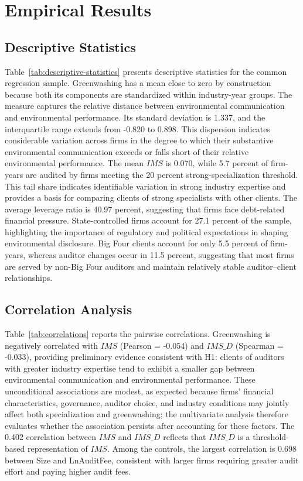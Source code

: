 \documentclass[11pt]{article}
\begin{document}
\section{Empirical Results}

\subsection{Descriptive Statistics}

Table~\ref{tab:descriptive-statistics} presents descriptive statistics for the common regression sample. 
Greenwashing has a mean close to zero by construction because both its components are standardized within industry-year groups. 
The measure captures the relative distance between environmental communication and environmental performance. 
Its standard deviation is 1.337, and the interquartile range extends from -0.820 to 0.898. 
This dispersion indicates considerable variation across firms in the degree to which their substantive environmental communication exceeds or falls short of their relative environmental performance.
The mean \(IMS\) is 0.070, while 5.7 percent of firm-years are audited by firms meeting the 20 percent strong-specialization threshold. 
This tail share indicates identifiable variation in strong industry expertise and provides a basis for comparing clients of strong specialists with other clients.
The average leverage ratio is 40.97 percent, suggesting that firms face debt-related financial pressure.
State-controlled firms account for 27.1 percent of the sample, highlighting the importance of regulatory and political expectations in shaping environmental disclosure. 
Big Four clients account for only 5.5 percent of firm-years, whereas auditor changes occur in 11.5 percent, suggesting that most firms are served by non-Big Four auditors and maintain relatively stable auditor–client relationships.

\subsection{Correlation Analysis}

Table~\ref{tab:correlations} reports the pairwise correlations. 
Greenwashing is negatively correlated with \(IMS\) (Pearson = -0.054) and \(IMS\_D\) (Spearman = -0.033), providing preliminary evidence consistent with H1: clients of auditors with greater industry expertise tend to exhibit a smaller gap between environmental communication and environmental performance. 
These unconditional associations are modest, as expected because firms' financial characteristics, governance, auditor choice, and industry conditions may jointly affect both specialization and greenwashing; the multivariate analysis therefore evaluates whether the association persists after accounting for these factors. 
The 0.402 correlation between \(IMS\) and \(IMS\_D\) reflects that \(IMS\_D\) is a threshold-based representation of \(IMS\). 
Among the controls, the largest correlation is 0.698 between Size and LnAuditFee, consistent with larger firms requiring greater audit effort and paying higher audit fees.
\end{document}
